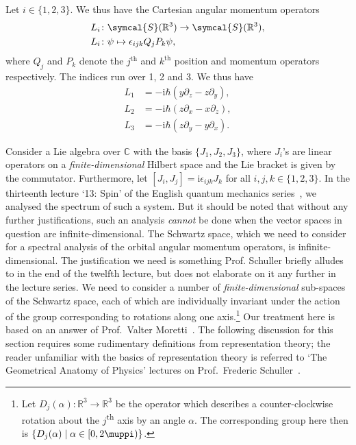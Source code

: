 \documentclass[12pt, a4 paper]{article}
\theoremstyle{definition}
\newcommand{\position}{Q}
\newcommand{\momentum}{P}
\newcommand{\rthree}{\mathbb{R}^3}
\newcommand{\rr}{\mathbb{R}}
\newcommand{\cc}{\mathbb{C}}
\newcommand{\schwartz}{\symcal{S}}
\newcommand{\schwartzrthree}{\schwartz(\rr^3)}
\renewcommand{\i}{\mathrm{i}}
\renewcommand{\pi}{\muppi}
\newcommand{\levi}{\epsilon_{ijk}}
\begin{document}
	Let $i \in \{1,2,3\}$. We thus have the Cartesian angular momentum operators
	\begin{align*}
		L_i &\colon \schwartzrthree \rightarrow \schwartzrthree,\\
		L_i &\colon \psi \mapsto \levi\position_j\momentum_k\psi,
	\end{align*}
	where $\position_j$ and $\momentum_k$ denote the $j^\text{th}$ and $k^\text{th}$ position and momentum operators respectively. The indices run over 1, 2 and 3.
	We thus have
	\begin{align*}
		L_1 &= -\i\hbar(y\partial_z - z\partial_y),\\
		L_2 &= -\i\hbar(z\partial_x - x\partial_z),\\
		L_3 &= -\i\hbar(z\partial_y - y\partial_x).
	\end{align*}

	Consider a Lie algebra over \(\cc\) with the basis \(\{J_1, J_2, J_3\}\), where \(J_i\)'s are linear operators on a \textit{finite-dimensional} Hilbert space and the Lie bracket is given by the commutator. Furthermore, let \([J_i, J_j] = \i \epsilon_{ijk} J_k\) for all \(i, j, k \in \{1, 2, 3\}\). In the thirteenth lecture `13: Spin' of the English quantum mechanics series~\cite{Schuller, SchullerVideos}, we analysed the spectrum of such a system. But it should be noted that without any further justifications, such an analysis \textit{cannot} be done when the vector spaces in question are infinite-dimensional. The Schwartz space, which we need to consider for a spectral analysis of the orbital angular momentum operators, is infinite-dimensional. The justification we need is something Prof. Schuller briefly alludes to in the end of the twelfth lecture, but does not elaborate on it any further in the lecture series. We need to consider a number of \textit{finite-dimensional} sub-spaces of the Schwartz space, each of which are individually invariant under the action of the group corresponding to rotations along one axis.\footnote{Let \(D_j(\alpha) \colon \rthree \rightarrow \rthree\) be the operator which describes a counter-clockwise rotation about the \(j\)\textsuperscript{th} axis by an angle \(\alpha\). The corresponding group here then is \(\{D_j(\alpha) \mid \alpha \in [0, 2\pi)\}\).} Our treatment here is based on an answer of Prof.\ Valter Moretti~\cite{MorettiPeter}. The following discussion for this section requires some rudimentary definitions from representation theory; the reader unfamiliar with the basics of representation theory is referred to `The Geometrical Anatomy of Physics' lectures on Prof.\ Frederic Schuller~\cite{Schuller_geometric_videos, Schuller_geometric_videos}.
\end{document}
